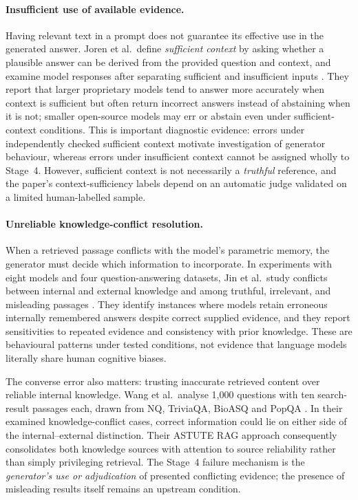 \paragraph{Insufficient use of available evidence.}
Having relevant text in a prompt does not guarantee its effective use in the generated answer. Joren et al.\ define \emph{sufficient context} by asking whether a plausible answer can be derived from the provided question and context, and examine model responses after separating sufficient and insufficient inputs \cite[Secs.~3--4]{joren2025sufficient}. They report that larger proprietary models tend to answer more accurately when context is sufficient but often return incorrect answers instead of abstaining when it is not; smaller open-source models may err or abstain even under sufficient-context conditions. This is important diagnostic evidence: errors under independently checked sufficient context motivate investigation of generator behaviour, whereas errors under insufficient context cannot be assigned wholly to Stage~4. However, sufficient context is not necessarily a \emph{truthful} reference, and the paper's context-sufficiency labels depend on an automatic judge validated on a limited human-labelled sample.

\paragraph{Unreliable knowledge-conflict resolution.}
When a retrieved passage conflicts with the model's parametric memory, the generator must decide which information to incorporate. In experiments with eight models and four question-answering datasets, Jin et al.\ study conflicts between internal and external knowledge and among truthful, irrelevant, and misleading passages \cite[Secs.~3--4]{jin2024tug}. They identify instances where models retain erroneous internally remembered answers despite correct supplied evidence, and they report sensitivities to repeated evidence and consistency with prior knowledge. These are behavioural patterns under tested conditions, not evidence that language models literally share human cognitive biases.

The converse error also matters: trusting inaccurate retrieved content over reliable internal knowledge. Wang et al.\ analyse 1,000 questions with ten search-result passages each, drawn from NQ, TriviaQA, BioASQ and PopQA \cite[Sec.~3]{wang2025astute}. In their examined knowledge-conflict cases, correct information could lie on either side of the internal--external distinction. Their ASTUTE RAG approach consequently consolidates both knowledge sources with attention to source reliability rather than simply privileging retrieval. The Stage~4 failure mechanism is the \emph{generator's use or adjudication} of presented conflicting evidence; the presence of misleading results itself remains an upstream condition.

